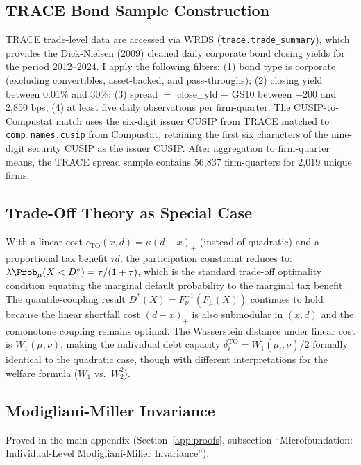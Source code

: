 

\subsection{TRACE Bond Sample Construction}
\label{app:fisd}

TRACE trade-level data are accessed via WRDS (\texttt{trace.trade\_summary}), which provides the Dick-Nielsen (2009) cleaned daily corporate bond closing yields for the period 2012--2024. I apply the following filters: (1) bond type is corporate (excluding convertibles, asset-backed, and pass-throughs); (2) closing yield between 0.01\% and 30\%; (3) spread $= $ close\_yld $-$ GS10 between $-200$ and 2,850 bps; (4) at least five daily observations per firm-quarter. The CUSIP-to-Compustat match uses the six-digit issuer CUSIP from TRACE matched to \texttt{comp.names.cusip} from Compustat, retaining the first six characters of the nine-digit security CUSIP as the issuer CUSIP. After aggregation to firm-quarter means, the TRACE spread sample contains 56,837 firm-quarters for 2,019 unique firms.

\subsection{Trade-Off Theory as Special Case}
\label{app:tradeoff_special_case}

With a linear cost $c_{\mathrm{TO}}(x,d) = \kappa(d-x)_+$ (instead of quadratic) and a proportional tax benefit $\tau d$, the participation constraint reduces to: $\lambda \Prob_\mu(X < D^*) = \tau/(1+\tau)$, which is the standard trade-off optimality condition equating the marginal default probability to the marginal tax benefit. The quantile-coupling result $D^*(X) = F_\nu^{-1}(F_\mu(X))$ continues to hold because the linear shortfall cost $(d-x)_+$ is also submodular in $(x,d)$ and the comonotone coupling remains optimal. The Wasserstein distance under linear cost is $W_1(\mu,\nu)$, making the individual debt capacity $\delta_i^{\text{TO}} = W_1(\mu_i,\nu)/2$ formally identical to the quadratic case, though with different interpretations for the welfare formula ($W_1$ vs.\ $W_2^2$).

\subsection{Modigliani-Miller Invariance}
\label{app:mm_invariance}

Proved in the main appendix (Section~\ref{app:proofs}, subsection ``Microfoundation: Individual-Level Modigliani-Miller Invariance'').

